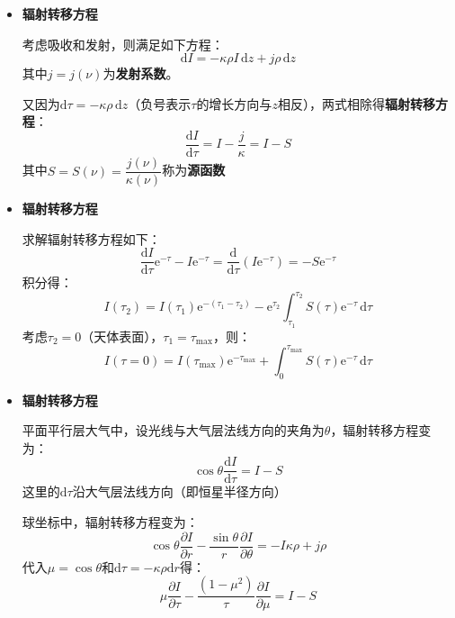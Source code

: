 \documentclass{beamer}
\newenvironment{slide}{
    \begin{frame}{\bfseries{\sectiontitle}}
}{
    \end{frame}
}
\begin{document}
\begin{slide}
    \begin{itemize}
        \item \textbf{辐射转移方程}

        考虑吸收和发射，则满足如下方程：
        \[
            \mathrm{d}I = -\kappa\rho I\,\mathrm{d}z + j\rho\,\mathrm{d}z
        \]
        其中$j=j(\nu)$为\textbf{发射系数}。

        又因为$\mathrm{d}\tau=-\kappa\rho\,\mathrm{d}z$（负号表示$\tau$的增长方向与$z$相反），两式相除得\textbf{辐射转移方程}：
        \[
            \boxed{
            \frac{\mathrm{d}I}{\mathrm{d}\tau} = I - \frac{j}{\kappa} = I - S
            }
        \]
        其中$\boxed{S=S(\nu)=\dfrac{j(\nu)}{\kappa(\nu)}}$称为\textbf{源函数}
    \end{itemize}
\end{slide}

\begin{slide}
    \begin{itemize}
        \item \textbf{辐射转移方程}

        求解辐射转移方程如下：
        \[
            \frac{\mathrm{d}I}{\mathrm{d}\tau}\mathrm{e}^{-\tau} - I\mathrm{e}^{-\tau} = \frac{\mathrm{d}}{\mathrm{d}\tau}(I\mathrm{e}^{-\tau}) = -S\mathrm{e}^{-\tau}
        \]
        积分得：
        \[
            I(\tau_2) = I(\tau_1)\mathrm{e}^{-(\tau_1-\tau_2)} - \mathrm{e}^{\tau_2}\int_{\tau_1}^{\tau_2}S(\tau)\mathrm{e}^{-\tau}\,\mathrm{d}\tau
        \]
        考虑$\tau_2=0$（天体表面），$\tau_1=\tau_{\mathrm{max}}$，则：
        \[
            I(\tau=0) = I(\tau_{\mathrm{max}})\mathrm{e}^{-\tau_{\mathrm{max}}} + \int_{0}^{\tau_{\mathrm{max}}}S(\tau)\mathrm{e}^{-\tau}\,\mathrm{d}\tau
        \]
    \end{itemize}
\end{slide}

\begin{slide}
    \begin{itemize}
        \item \textbf{辐射转移方程}

        平面平行层大气中，设光线与大气层法线方向的夹角为$\theta$，辐射转移方程变为：
        \[
            \cos\theta\frac{\mathrm{d}I}{\mathrm{d}\tau} = I - S
        \]
        这里的$\mathrm{d}\tau$沿大气层法线方向（即恒星半径方向）

        球坐标中，辐射转移方程变为：
        \[
            \cos\theta\frac{\partial I}{\partial r} - \frac{\sin\theta}{r}\frac{\partial I}{\partial\theta} = -I\kappa\rho + j\rho
        \]
        代入$\mu=\cos\theta$和$\mathrm{d}\tau=-\kappa\rho\mathrm{d}r$得：
        \[
            \mu\frac{\partial I}{\partial\tau} - \frac{(1-\mu^2)}{\tau}\frac{\partial I}{\partial\mu} = I - S
        \]
    \end{itemize}
\end{slide}
\end{document}
